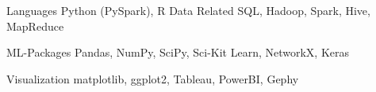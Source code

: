 

\begin{cvskills}

  \cvskill
    {Languages} %
    {Python (PySpark), R} %
  \cvskill
    {Data Related} %
    {SQL, Hadoop, Spark, Hive, MapReduce} %
    
  \cvskill
    {ML-Packages} %
    {Pandas, NumPy, SciPy, Sci-Kit Learn, NetworkX, Keras } %

  \cvskill
    {Visualization} %
    {matplotlib, ggplot2, Tableau, PowerBI, Gephy}
    
\end{cvskills}
